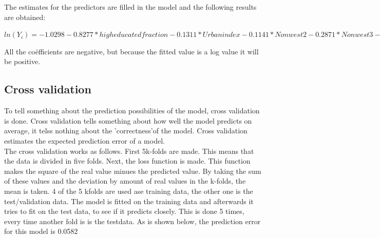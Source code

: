 \documentclass[11pt,]{article}
\begin{document}
The estimates for the predictors are filled in the model and the
following results are obtained:

\(ln(Y_i) = -1.0298 -0.8277*high educated fraction -0.1311*Urban index -0.1141*Non west2 -0.2871*Non west3 -3.0168*Frac 60plus + \epsilon i\)

All the coëfficients are negative, but because the fitted value is a log
value it will be positive.

\subsection{Cross validation}\label{cross-validation}

To tell something about the prediction possibilities of the model, cross
validation is done. Cross validation tells something about how well the
model predicts on average, it telss nothing about the 'correctness'of
the model. Cross validation estimates the expected prediction error of a
model.\\
The cross validation works as follows. First 5k-folds are made. This
means that the data is divided in five folds. Next, the loss function is
made. This function makes the square of the real value minues the
predicted value. By taking the sum of these values and the deviation by
amount of real values in the k-folds, the mean is taken. 4 of the 5
kfolds are used ase training data, the other one is the test/validation
data. The model is fitted on the training data and afterwards it tries
to fit on the test data, to see if it predicts closely. This is done 5
times, every time another fold is is the testdata. As is shown below,
the prediction error for this model is 0.0582
\end{document}
